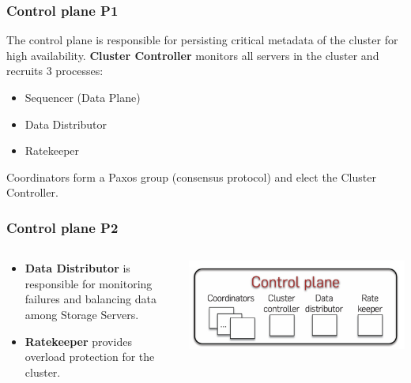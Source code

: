 
\begin{frame}
	\frametitle{Control plane P1}

The control plane is responsible for persisting critical metadata of the cluster for high availability.
\textbf{Cluster Controller} monitors all servers in the cluster and recruits 3 processes:
\begin{itemize}
    \item Sequencer (Data Plane)
    \item Data Distributor
    \item Ratekeeper
\end{itemize}

Coordinators form a Paxos group (consensus protocol) and elect the Cluster Controller.
\end{frame}



\begin{frame}
    \frametitle{Control plane P2}
    \begin{columns}
        \begin{column}{0.5\textwidth}
        \begin{itemize}
        \item \textbf{Data Distributor} is responsible for monitoring failures and balancing data among Storage Servers.
        \item \textbf{Ratekeeper} provides overload protection for the cluster.
        \end{itemize}
        
        \end{column}
        \begin{column}{0.5\textwidth}
            \centering
            \includegraphics[width=\textwidth]{img/2-Architecture/Control plane.png}
        \end{column}
    \end{columns}
\end{frame}

